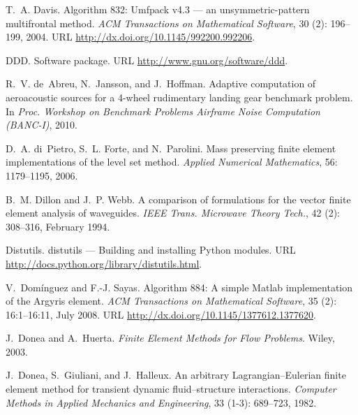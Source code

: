\begin{thebibliography}{467}
T.~A. Davis.
\newblock Algorithm 832: Umfpack v4.3 --- an unsymmetric-pattern multifrontal
  method.
\newblock \emph{ACM Transactions on Mathematical Software}, 30
  (2): 196--199, 2004.
\newblock URL \url{http://dx.doi.org/10.1145/992200.992206}.

DDD.
\newblock Software package.
\newblock URL \url{http://www.gnu.org/software/ddd}.

R.~V. de~Abreu, N.~Jansson, and J.~Hoffman.
\newblock Adaptive computation of aeroacoustic sources for a 4-wheel
  rudimentary landing gear benchmark problem.
\newblock In \emph{Proc. Workshop on Benchmark Problems Airframe Noise
  Computation (BANC-I)}, 2010.

D.~A. di~Pietro, S.~L. Forte, and N.~Parolini.
\newblock Mass preserving finite element implementations of the level set
  method.
\newblock \emph{Applied Numerical Mathematics}, 56: 1179--1195, 2006.

B.~M. Dillon and J.~P. Webb.
\newblock A comparison of formulations for the vector finite element analysis
  of waveguides.
\newblock \emph{IEEE Trans. Microwave Theory Tech.}, 42 (2):
  308--316, February 1994.

Distutils.
\newblock distutils — {B}uilding and installing {P}ython modules.
\newblock URL \url{http://docs.python.org/library/distutils.html}.

V.~Dom\'{i}nguez and F.-J. Sayas.
\newblock Algorithm 884: A simple {Matlab} implementation of the {Argyris}
  element.
\newblock \emph{ACM Transactions on Mathematical Software}, 35
  (2): 16:1--16:11, July 2008.
\newblock URL \url{http://dx.doi.org/10.1145/1377612.1377620}.

J.~Donea and A.~Huerta.
\newblock \emph{Finite Element Methods for Flow Problems}.
\newblock Wiley, 2003.

J.~Donea, S.~Giuliani, and J.~Halleux.
\newblock An arbitrary {L}agrangian--{E}ulerian finite element method for
  transient dynamic fluid--structure interactions.
\newblock \emph{Computer Methods in Applied Mechanics and Engineering},
  33 (1-3): 689--723, 1982.


\end{thebibliography}
